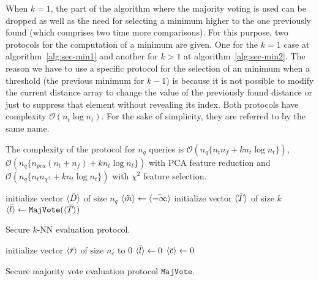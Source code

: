 When $k=1$, the part of the algorithm where the majority voting is used can be dropped as well as the need for selecting a minimum higher to the one previously found (which comprises two time more comparisons). For this purpose, two protocols for the computation of a minimum are given. One for the $k=1$ case at algorithm~\ref{alg:sec-min1} and another for $k>1$ at algorithm~\ref{alg:sec-min2}. The reason we have to use a specific protocol for the selection of an minimum when a threshold (the previous minimum for $k-1$) is because it is not possible to modify the current distance array to change the value of the previously found distance or just to suppress that element without revealing its index. Both protocols have complexity $\mathcal{O}(n_t \log n_t)$. For the sake of simplicity, they are referred to by the same name.

The complexity of the protocol for $n_q$ queries is $\mathcal{O}(n_q\{n_tn_f + kn_t \log n_t\})$, $\mathcal{O}(n_q\{n_{pca}(n_t+n_f) + kn_t \log n_t\})$ with PCA feature reduction and $\mathcal{O}(n_q\{n_tn_{\chi^2} + kn_t \log n_t\})$ with $\chi^2$ feature selection.

\begin{center}
\begin{algorithm}[H]
\DontPrintSemicolon
initialize vector $\langle \tilde{D} \rangle$ of size $n_q$ \;
$\langle \tilde{m} \rangle \leftarrow \langle \bar{-\infty} \rangle$ \;
initialize vector $\langle \bar{T} \rangle$ of size $k$ \;
$\langle \bar{l} \rangle \leftarrow \mathtt{MajVote}(\langle \bar{T} \rangle)$ \;
\caption{Secure $k$-NN evaluation protocol.}
\label{alg:sec-knn}
\end{algorithm}
\end{center}

\begin{center}
\begin{algorithm}[H]
\DontPrintSemicolon
initialize vector $\langle \bar{r} \rangle$ of size $n_c$ to 0\;
$\langle \bar{l} \rangle \leftarrow 0$ \;
$\langle \bar{c} \rangle \leftarrow 0$ \;
\caption{Secure majority vote evaluation protocol $\mathtt{MajVote}$.}
\label{alg:sec-win}
\end{algorithm}
\end{center}


